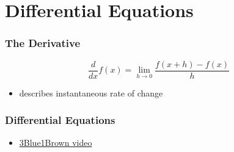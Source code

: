 \documentclass[aspectratio=169]{beamer}
\newcommand{\diff}[1]{\frac{d}{d #1}}
\begin{document}
\section{Differential Equations}

\begin{frame}
    \frametitle{The Derivative}

    \begin{equation}
        \diff{x} f(x) = \lim_{h \to 0} \frac{f(x + h) - f(x)}{h}
    \end{equation}
    \begin{itemize}
        \item describes instantaneous rate of change
    \end{itemize}
\end{frame}

\begin{frame}
    \frametitle{Differential Equations}

    \begin{itemize}
        \item \href{https://youtu.be/p_di4Zn4wz4?list=PLZHQObOWTQDNPOjrT6KVlfJuKtYTftqH6}{3Blue1Brown video}
    \end{itemize}

\end{frame}
\end{document}
